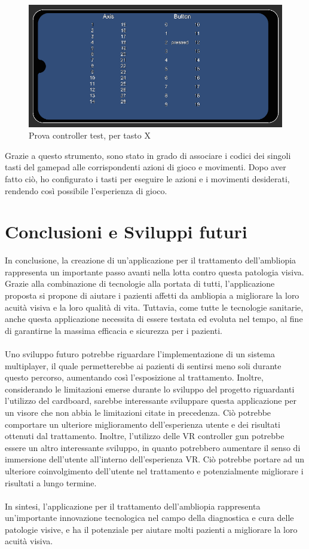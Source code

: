 \documentclass[
a4paper,
cleardoublepage=empty,
headings=twolinechapter,
numbers=autoenddot,
]{scrbook}
\begin{document}
    \begin{figure}[h]
    	\centering
    	\includegraphics[width=0.7\linewidth]{image/controller_test}
    	\caption{Prova controller test, per tasto X}
    	\label{fig:controller_test}
    \end{figure}
    Grazie a questo strumento, sono stato in grado di associare i codici dei singoli tasti del gamepad alle corrispondenti azioni di gioco e movimenti. Dopo aver fatto ciò, ho configurato i tasti per eseguire le azioni e i movimenti desiderati, rendendo così possibile l'esperienza di gioco.
    \chapter{Conclusioni e Sviluppi futuri}
   In conclusione, la creazione di un'applicazione per il trattamento dell'ambliopia rappresenta un importante passo avanti nella lotta contro questa patologia visiva. Grazie alla combinazione di tecnologie alla portata di tutti, l'applicazione proposta si propone di aiutare i pazienti affetti da ambliopia a migliorare la loro acuità visiva e la loro qualità di vita. Tuttavia, come tutte le tecnologie sanitarie, anche questa applicazione necessita di essere testata ed evoluta nel tempo, al fine di garantirne la massima efficacia e sicurezza per i pazienti.\\\\
   
   Uno sviluppo futuro potrebbe riguardare l'implementazione di un sistema multiplayer, il quale permetterebbe ai pazienti di sentirsi meno soli durante questo percorso, aumentando così l'esposizione al trattamento. Inoltre, considerando le limitazioni emerse durante lo sviluppo del progetto riguardanti l'utilizzo del cardboard, sarebbe interessante sviluppare questa applicazione per un visore che non abbia le limitazioni citate in precedenza. Ciò potrebbe comportare un ulteriore miglioramento dell'esperienza utente e dei risultati ottenuti dal trattamento. Inoltre, l'utilizzo delle VR controller gun potrebbe essere un altro interessante sviluppo, in quanto potrebbero aumentare il senso di immersione dell'utente all'interno dell'esperienza VR. Ciò potrebbe portare ad un ulteriore coinvolgimento dell'utente nel trattamento e potenzialmente migliorare i risultati a lungo termine.\\\\
  
   In sintesi, l'applicazione per il trattamento dell'ambliopia rappresenta un'importante innovazione tecnologica nel campo della diagnostica e cura delle patologie visive, e ha il potenziale per aiutare molti pazienti a migliorare la loro acuità visiva.
    
	
		
\end{document}
